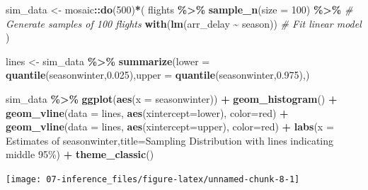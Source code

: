 \documentclass[
]{book}
\newenvironment{Shaded}{\begin{snugshade}}{\end{snugshade}}
\newcommand{\AttributeTok}[1]{\textcolor[rgb]{0.13,0.29,0.53}{#1}}
\newcommand{\CommentTok}[1]{\textcolor[rgb]{0.56,0.35,0.01}{\textit{#1}}}
\newcommand{\DecValTok}[1]{\textcolor[rgb]{0.00,0.00,0.81}{#1}}
\newcommand{\FloatTok}[1]{\textcolor[rgb]{0.00,0.00,0.81}{#1}}
\newcommand{\FunctionTok}[1]{\textcolor[rgb]{0.13,0.29,0.53}{\textbf{#1}}}
\newcommand{\NormalTok}[1]{#1}
\newcommand{\OtherTok}[1]{\textcolor[rgb]{0.56,0.35,0.01}{#1}}
\newcommand{\SpecialCharTok}[1]{\textcolor[rgb]{0.81,0.36,0.00}{\textbf{#1}}}
\newcommand{\StringTok}[1]{\textcolor[rgb]{0.31,0.60,0.02}{#1}}
\begin{document}
\begin{Shaded}
\begin{Highlighting}[]
\NormalTok{sim\_data }\OtherTok{\textless{}{-}}\NormalTok{ mosaic}\SpecialCharTok{::}\FunctionTok{do}\NormalTok{(}\DecValTok{500}\NormalTok{)}\SpecialCharTok{*}\NormalTok{( }
\NormalTok{    flights }\SpecialCharTok{\%\textgreater{}\%} 
      \FunctionTok{sample\_n}\NormalTok{(}\AttributeTok{size =} \DecValTok{100}\NormalTok{) }\SpecialCharTok{\%\textgreater{}\%}  \CommentTok{\# Generate samples of 100 flights}
      \FunctionTok{with}\NormalTok{(}\FunctionTok{lm}\NormalTok{(arr\_delay }\SpecialCharTok{\textasciitilde{}}\NormalTok{ season)) }\CommentTok{\# Fit linear model}
\NormalTok{)}

\NormalTok{lines }\OtherTok{\textless{}{-}}\NormalTok{ sim\_data }\SpecialCharTok{\%\textgreater{}\%}
  \FunctionTok{summarize}\NormalTok{(}\AttributeTok{lower =} \FunctionTok{quantile}\NormalTok{(seasonwinter,}\FloatTok{0.025}\NormalTok{),}\AttributeTok{upper =} \FunctionTok{quantile}\NormalTok{(seasonwinter,}\FloatTok{0.975}\NormalTok{),)}

\NormalTok{sim\_data }\SpecialCharTok{\%\textgreater{}\%}
  \FunctionTok{ggplot}\NormalTok{(}\FunctionTok{aes}\NormalTok{(}\AttributeTok{x =}\NormalTok{ seasonwinter)) }\SpecialCharTok{+} 
  \FunctionTok{geom\_histogram}\NormalTok{() }\SpecialCharTok{+} 
  \FunctionTok{geom\_vline}\NormalTok{(}\AttributeTok{data =}\NormalTok{ lines, }\FunctionTok{aes}\NormalTok{(}\AttributeTok{xintercept=}\NormalTok{lower), }\AttributeTok{color=}\StringTok{\textquotesingle{}red\textquotesingle{}}\NormalTok{) }\SpecialCharTok{+} 
  \FunctionTok{geom\_vline}\NormalTok{(}\AttributeTok{data =}\NormalTok{ lines, }\FunctionTok{aes}\NormalTok{(}\AttributeTok{xintercept=}\NormalTok{upper), }\AttributeTok{color=}\StringTok{\textquotesingle{}red\textquotesingle{}}\NormalTok{) }\SpecialCharTok{+} 
  \FunctionTok{labs}\NormalTok{(}\AttributeTok{x =} \StringTok{\textquotesingle{}Estimates of seasonwinter\textquotesingle{}}\NormalTok{,}\AttributeTok{title=}\StringTok{\textquotesingle{}Sampling Distribution with lines indicating middle 95\%\textquotesingle{}}\NormalTok{) }\SpecialCharTok{+} 
  \FunctionTok{theme\_classic}\NormalTok{()}
\end{Highlighting}
\end{Shaded}

\begin{center}\texttt{[image: 07-inference\_files/figure-latex/unnamed-chunk-8-1]} \end{center}
\end{document}
